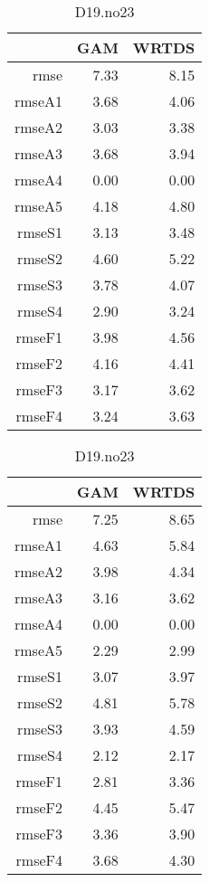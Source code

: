 \documentclass[12pt]{amsart}
\begin{document}
\begin{table}[H]
\centering
\begin{tabular}{rrr}
  \hline
 & GAM & WRTDS \\ 
  \hline
rmse & 7.33 & 8.15 \\ 
  rmseA1 & 3.68 & 4.06 \\ 
  rmseA2 & 3.03 & 3.38 \\ 
  rmseA3 & 3.68 & 3.94 \\ 
  rmseA4 & 0.00 & 0.00 \\ 
  rmseA5 & 4.18 & 4.80 \\ 
  rmseS1 & 3.13 & 3.48 \\ 
  rmseS2 & 4.60 & 5.22 \\ 
  rmseS3 & 3.78 & 4.07 \\ 
  rmseS4 & 2.90 & 3.24 \\ 
  rmseF1 & 3.98 & 4.56 \\ 
  rmseF2 & 4.16 & 4.41 \\ 
  rmseF3 & 3.17 & 3.62 \\ 
  rmseF4 & 3.24 & 3.63 \\ 
   \hline
\end{tabular}
\caption{D19.no23}
\end{table}

\begin{table}[H]
\centering
\begin{tabular}{rrr}
  \hline
 & GAM & WRTDS \\ 
  \hline
rmse & 7.25 & 8.65 \\ 
  rmseA1 & 4.63 & 5.84 \\ 
  rmseA2 & 3.98 & 4.34 \\ 
  rmseA3 & 3.16 & 3.62 \\ 
  rmseA4 & 0.00 & 0.00 \\ 
  rmseA5 & 2.29 & 2.99 \\ 
  rmseS1 & 3.07 & 3.97 \\ 
  rmseS2 & 4.81 & 5.78 \\ 
  rmseS3 & 3.93 & 4.59 \\ 
  rmseS4 & 2.12 & 2.17 \\ 
  rmseF1 & 2.81 & 3.36 \\ 
  rmseF2 & 4.45 & 5.47 \\ 
  rmseF3 & 3.36 & 3.90 \\ 
  rmseF4 & 3.68 & 4.30 \\ 
   \hline
\end{tabular}
\caption{D19.no23}
\end{table}
\end{document}
